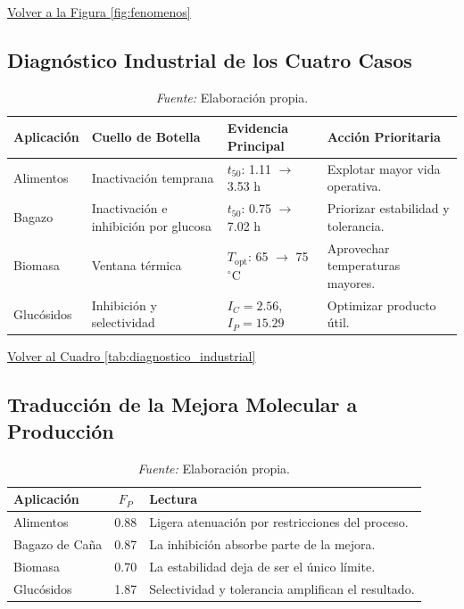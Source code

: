 \begin{center}
\small\hyperref[fig:fenomenos]{Volver a la Figura \ref*{fig:fenomenos}}
\end{center}


\subsection{Diagnóstico Industrial de los Cuatro Casos}
\label{anx:tab_diagnostico}

\begin{table}[H]
\centering
\caption{Diagnóstico Industrial de los Cuatro Casos}
\caption*{\small\textit{Fuente:} Elaboración propia.}
\renewcommand{\arraystretch}{1.25}
\begin{tabularx}{\textwidth}{|p{2.4cm}|p{3.2cm}|p{3.2cm}|X|}
\hline
Aplicación & Cuello de Botella & Evidencia Principal & Acción Prioritaria \\ \hline
Alimentos & Inactivación temprana & \(t_{50}\): 1.11 \(\rightarrow\) 3.53 h &
Explotar mayor vida operativa. \\ \hline
Bagazo & Inactivación e inhibición por glucosa &
\(t_{50}\): 0.75 \(\rightarrow\) 7.02 h & Priorizar estabilidad y tolerancia. \\ \hline
Biomasa & Ventana térmica &
\(T_{\mathrm{opt}}\): 65 \(\rightarrow\) 75 \(^{\circ}\)C &
Aprovechar temperaturas mayores. \\ \hline
Glucósidos & Inhibición y selectividad &
\(I_C=2.56\), \(I_P=15.29\) & Optimizar producto útil. \\ \hline
\end{tabularx}
\end{table}

\begin{center}
\small\hyperref[tab:diagnostico_industrial]{Volver al Cuadro \ref*{tab:diagnostico_industrial}}
\end{center}


\subsection{Traducción de la Mejora Molecular a Producción}
\label{anx:tab_traduccion}

\begin{table}[H]
\centering
\caption{Traducción de la Mejora Molecular a Producción}
\caption*{\small\textit{Fuente:} Elaboración propia.}
\renewcommand{\arraystretch}{1.25}
\begin{tabular}{|l|c|l|}
\hline
Aplicación & \(F_P\) & Lectura \\ \hline
Alimentos & 0.88 & Ligera atenuación por restricciones del proceso. \\ \hline
Bagazo de Caña & 0.87 & La inhibición absorbe parte de la mejora. \\ \hline
Biomasa & 0.70 & La estabilidad deja de ser el único límite. \\ \hline
Glucósidos & 1.87 & Selectividad y tolerancia amplifican el resultado. \\ \hline
\end{tabular}
\end{table}

